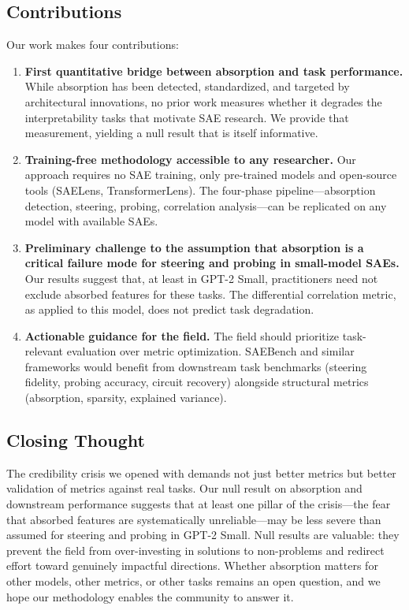 \documentclass{article}
\begin{document}
\subsection{Contributions}

Our work makes four contributions:

\begin{enumerate}
    \item \textbf{First quantitative bridge between absorption and task performance.} While absorption has been detected, standardized, and targeted by architectural innovations, no prior work measures whether it degrades the interpretability tasks that motivate SAE research. We provide that measurement, yielding a null result that is itself informative.
    \item \textbf{Training-free methodology accessible to any researcher.} Our approach requires no SAE training, only pre-trained models and open-source tools (SAELens, TransformerLens). The four-phase pipeline---absorption detection, steering, probing, correlation analysis---can be replicated on any model with available SAEs.
    \item \textbf{Preliminary challenge to the assumption that absorption is a critical failure mode for steering and probing in small-model SAEs.} Our results suggest that, at least in GPT-2 Small, practitioners need not exclude absorbed features for these tasks. The differential correlation metric, as applied to this model, does not predict task degradation.
    \item \textbf{Actionable guidance for the field.} The field should prioritize task-relevant evaluation over metric optimization. SAEBench and similar frameworks would benefit from downstream task benchmarks (steering fidelity, probing accuracy, circuit recovery) alongside structural metrics (absorption, sparsity, explained variance).
\end{enumerate}

\subsection{Closing Thought}

The credibility crisis we opened with demands not just better metrics but better validation of metrics against real tasks. Our null result on absorption and downstream performance suggests that at least one pillar of the crisis---the fear that absorbed features are systematically unreliable---may be less severe than assumed for steering and probing in GPT-2 Small. Null results are valuable: they prevent the field from over-investing in solutions to non-problems and redirect effort toward genuinely impactful directions. Whether absorption matters for other models, other metrics, or other tasks remains an open question, and we hope our methodology enables the community to answer it.



\end{document}
